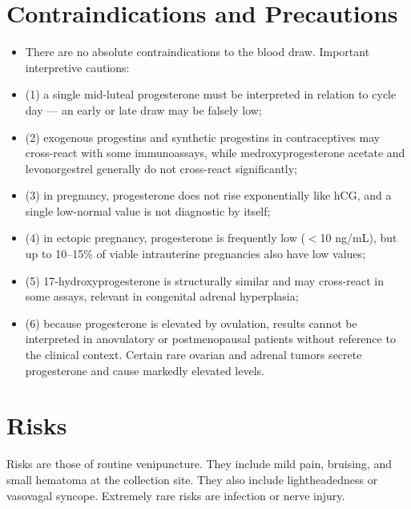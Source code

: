 \section*{Contraindications and Precautions}
\begin{itemize}
  \item There are no absolute contraindications to the blood draw. Important interpretive cautions:
  \item (1) a single mid-luteal progesterone must be interpreted in relation to cycle day --- an early or late draw may be falsely low;
  \item (2) exogenous progestins and synthetic progestins in contraceptives may cross-react with some immunoassays, while medroxyprogesterone acetate and levonorgestrel generally do not cross-react significantly;
  \item (3) in pregnancy, progesterone does not rise exponentially like hCG, and a single low-normal value is not diagnostic by itself;
  \item (4) in ectopic pregnancy, progesterone is frequently low ($<$10 ng/mL), but up to 10--15\% of viable intrauterine pregnancies also have low values;
  \item (5) 17-hydroxyprogesterone is structurally similar and may cross-react in some assays, relevant in congenital adrenal hyperplasia;
  \item (6) because progesterone is elevated by ovulation, results cannot be interpreted in anovulatory or postmenopausal patients without reference to the clinical context. Certain rare ovarian and adrenal tumors secrete progesterone and cause markedly elevated levels.
\end{itemize}
\section*{Risks}
Risks are those of routine venipuncture. They include mild pain, bruising, and small hematoma at the collection site. They also include lightheadedness or vasovagal syncope. Extremely rare risks are infection or nerve injury.


